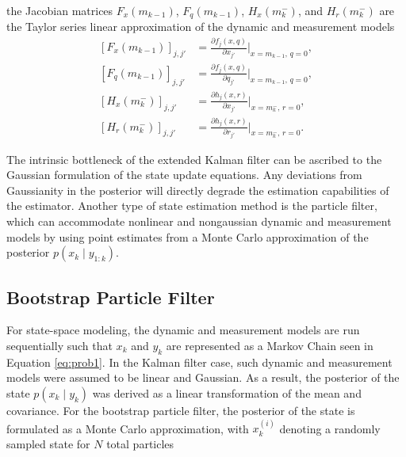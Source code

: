 \documentclass[nomenclature, english, bibtex]{kththesis}
\begin{document}
the Jacobian matrices $F_x(m_{k-1})$, $F_q(m_{k-1})$, $H_x(m_k^-)$, and $H_r(m_k^-)$ are the Taylor series linear approximation of the dynamic and measurement models
\begin{equation}
    \begin{aligned}
        \left[F_x(m_{k-1})\right]_{j,j'} &= \frac{\partial f_j(x,q)}{\partial x_{j'}}\bigg\rvert_{x=m_{k-1}, \,q=0}, \\
        \left[F_q(m_{k-1})\right]_{j,j'} &= \frac{\partial f_j(x,q)}{\partial q_{j'}}\bigg\rvert_{x=m_{k-1}, \,q=0}, \\
        \left[H_x(m_k^-)\right]_{j,j'} &= \frac{\partial h_j(x,r)}{\partial x_{j'}}\bigg\rvert_{x=m_k^-, \,r=0}, \\
        \left[H_r(m_k^-)\right]_{j,j'} &= \frac{\partial h_j(x,r)}{\partial r_{j'}}\bigg\rvert_{x=m_k^-, \,r=0}.
    \end{aligned}
\end{equation}

The intrinsic bottleneck of the extended Kalman filter can be ascribed to the Gaussian formulation of the state update equations. Any deviations from Gaussianity in the posterior will directly degrade the estimation capabilities of the estimator. Another type of state estimation method is the particle filter, which can accommodate nonlinear and nongaussian dynamic and measurement models by using point estimates from a Monte Carlo approximation of the posterior $p(x_k \mid y_{1:k})$.

\subsection{Bootstrap Particle Filter} \label{sec:particle}
For state-space modeling, the dynamic and measurement models are run sequentially such that $x_k$ and $y_k$ are represented as a Markov Chain seen in Equation \eqref{eq:prob1}.
In the Kalman filter case, such dynamic and measurement models were assumed to be linear and Gaussian. As a result, the posterior of the state $p(x_k \mid y_k)$ was derived as a linear transformation of the mean and covariance. For the bootstrap particle filter, the posterior of the state is formulated as a Monte Carlo approximation, with $x_k^{(i)}$ denoting a randomly sampled state for $N$ total particles
\end{document}
